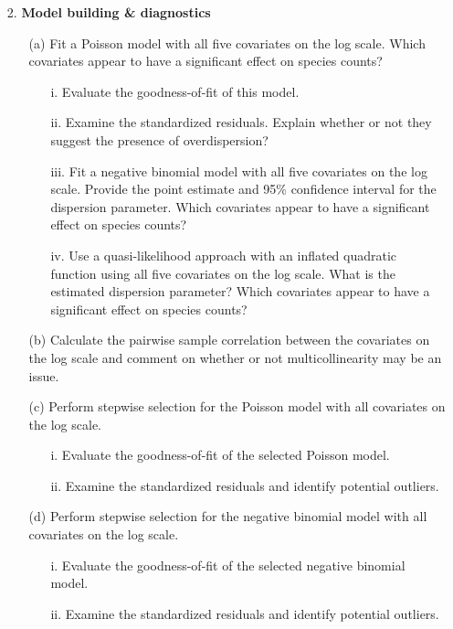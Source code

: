 \documentclass[11pt]{article}
\begin{document}
\begin{enumerate}
\item[2.] {\bf Model building \& diagnostics} 
\begin{itemize}
\item[(a)] Fit a Poisson model with all five covariates on the log scale. Which covariates appear to have a significant effect on species counts?
\begin{itemize}
\item[i.] Evaluate the goodness-of-fit of this model.
\item[ii.] Examine the standardized residuals. Explain whether or not they suggest the presence of overdispersion? 
\item[iii.] Fit a negative binomial model with all five covariates on the log scale. Provide the point estimate and 95\% confidence interval for the dispersion parameter.  Which covariates appear to have a significant effect on species counts?
\item[iv.] Use a quasi-likelihood approach with an inflated quadratic function using all five covariates on the log scale. What is the estimated dispersion parameter?  Which covariates appear to have a significant effect on species counts?
\end{itemize}
\item[(b)] Calculate the pairwise sample correlation between the covariates on the log scale and comment on whether or not multicollinearity may be an issue.
\item[(c)] Perform stepwise selection for the Poisson model with all covariates on the log scale.
\begin{itemize}
\item[i.] Evaluate the goodness-of-fit of the selected Poisson model.
\item[ii.] Examine the standardized residuals and identify potential outliers.
\end{itemize}
\item[(d)] Perform stepwise selection for the negative binomial model with all covariates on the log scale.
\begin{itemize}
\item[i.] Evaluate the goodness-of-fit of the selected negative binomial model.
\item[ii.] Examine the standardized residuals and identify potential outliers.
\end{itemize}
\end{itemize}

\end{enumerate}
\end{document}
